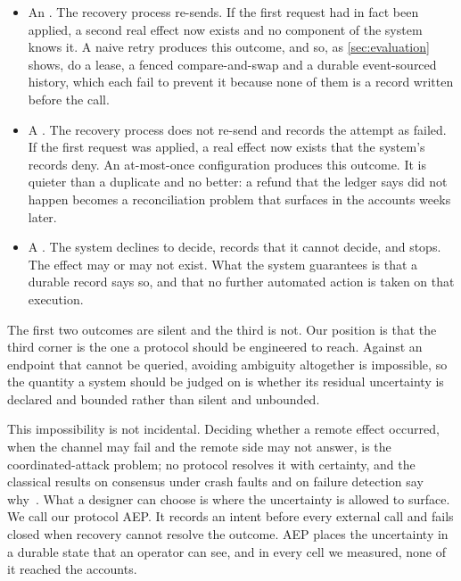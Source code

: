 \begin{itemize}
\item An \textbf{\undetdup{}}. The recovery process re-sends. If the first
      request had in fact been applied, a second real effect now exists and no
      component of the system knows it. A naive retry produces this outcome,
      and so, as \cref{sec:evaluation} shows, do a lease, a fenced
      compare-and-swap and a durable event-sourced history, which each fail
      to prevent it because none of them is a record written before the
      call.
\item A \textbf{\lostfx{}}. The recovery process does not re-send and records
      the attempt as failed. If the first request was applied, a real effect
      now exists that the system's records deny. An at-most-once configuration
      produces this outcome. It is quieter than a duplicate and no better: a
      refund that the ledger says did not happen becomes a reconciliation
      problem that surfaces in the accounts weeks later.
\item A \textbf{\declamb{}}. The system declines to decide, records that it
      cannot decide, and stops. The effect may or may not exist. What the
      system guarantees is that a durable record says so, and that no further
      automated action is taken on that execution.
\end{itemize}

The first two outcomes are silent and the third is not. Our position is that
the third corner is the one a protocol should be engineered to reach. Against
an endpoint that cannot be queried, avoiding ambiguity altogether is
impossible, so the quantity a system should be judged on is whether its
residual uncertainty is declared and bounded rather than silent and unbounded.

This impossibility is not incidental. Deciding whether a remote effect occurred,
when the channel may fail and the remote side may not answer, is the
coordinated-attack problem; no protocol resolves it with certainty, and the
classical results on consensus under crash faults and on failure detection say
why~\cite{fischer1985impossibility,chandra1996failuredetectors}. What a designer
can choose is where the uncertainty is allowed to surface. We call our protocol
AEP. It records an intent before every external call and fails closed when
recovery cannot resolve the outcome. AEP places the uncertainty in a durable
state that an operator can see, and in every cell we measured, none of it
reached the accounts.


